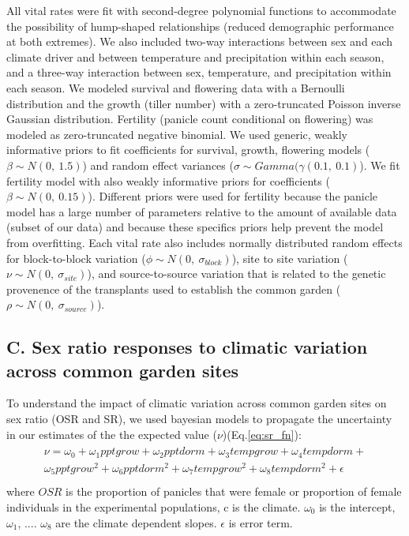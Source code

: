 \documentclass[9pt,twoside,lineno]{pnas-new}
\begin{document}
All  vital rates  were  fit with second-degree polynomial functions to accommodate the possibility of hump-shaped relationships (reduced demographic performance at both extremes).
We also included two-way interactions between sex and each climate driver and between temperature and precipitation within each season, and a three-way interaction between sex, temperature, and precipitation within each season. 
We modeled survival and flowering data with a Bernoulli distribution and the growth (tiller number) with a zero-truncated Poisson inverse Gaussian distribution. 
Fertility (panicle count conditional on flowering) was modeled as zero-truncated negative binomial. 
We used generic, weakly informative priors to fit coefficients for survival, growth, flowering models ($\beta \sim N(0,\ 1.5)$) and random effect variances ($\sigma \sim Gamma(\gamma (0.1,\ 0.1)$).
We fit fertility model with  also weakly informative priors for coefficients ($\beta \sim N(0,\ 0.15)$).
Different priors  were used for fertility because the panicle model has a large number of parameters relative to the amount of available data (subset of our data) and because these specifics priors help  prevent the model from overfitting. 
Each vital rate also includes normally distributed random effects for block-to-block variation ($\phi \sim N(0,\ \sigma_{block})$), site to site variation ($\nu \sim N(0,\ \sigma_{site})$), and source-to-source variation that is related to the genetic provenence of the transplants used to establish the common garden ($\rho \sim N(0,\ \sigma_{source})$).



\subsection*{C. Sex ratio responses to climatic variation across common garden sites} \label {sssec:sexratio_bayesian}
To understand the impact of climatic variation across common garden sites on {\color{red} sex ratio (OSR and SR), we used  bayesian models  to propagate the uncertainty in our estimates of the  the expected value ($\nu$)(Eq.\ref{eq:sr_fn})}:
\begin{align}\label{eq:sr_fn}
\begin{split}
	\nu =   \omega_{0}+ \omega_{1}pptgrow + \omega_{2}pptdorm + \omega_{3}tempgrow + \omega_{4}tempdorm + \\
	  \omega_{5}pptgrow^2 + \omega_{6}pptdorm^2 + \omega_{7}tempgrow^2 + \omega_{8}tempdorm^2 + \epsilon\\
\end{split}
\end{align}
\noindent where $OSR$ is the proportion of panicles that were female or proportion of female individuals in the experimental populations, c is the climate. 
$\omega_{0}$ is the intercept, $\omega_{1}$, .... $\omega_{8}$ are the climate dependent slopes. $\epsilon$ is error term.
\end{document}
